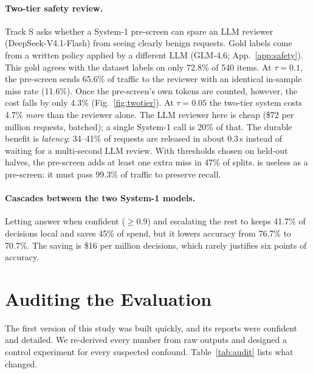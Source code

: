 \paragraph{Two-tier safety review.}
Track S asks whether a System-1 pre-screen can spare an LLM reviewer (DeepSeek-V4.1-Flash) from seeing clearly benign requests. Gold labels come from a written policy applied by a different LLM (GLM-4.6; App.~\ref{app:safety}). This gold agrees with the dataset labels on only 72.8\% of 540 items. At $\tau{=}0.1$, the \jev{} pre-screen sends 65.6\% of traffic to the reviewer with an identical in-sample miss rate (11.6\%). Once the pre-screen's own tokens are counted, however, the cost falls by only 4.3\% (Fig.~\ref{fig:twotier}). At $\tau{=}0.05$ the two-tier system costs 4.7\% \emph{more} than the reviewer alone. The LLM reviewer here is cheap (\$72 per million requests, batched); a single System-1 call is 20\% of that. The durable benefit is \emph{latency}: 34--41\% of requests are released in about 0.3\,s instead of waiting for a multi-second LLM review. With thresholds chosen on held-out halves, the pre-screen adds at least one extra miss in 47\% of splits. \laya{} is useless as a pre-screen: it must pass 99.3\% of traffic to preserve recall.

\paragraph{Cascades between the two System-1 models.}
Letting \laya{} answer when confident ($\geq$0.9) and escalating the rest to \jev{} keeps 41.7\% of decisions local and saves 45\% of \jev{} spend, but it lowers accuracy from 76.7\% to 70.7\%. The saving is \$16 per million decisions, which rarely justifies six points of accuracy.

\section{Auditing the Evaluation}\label{sec:audit}
The first version of this study was built quickly, and its reports were confident and detailed. We re-derived every number from raw outputs and designed a control experiment for every suspected confound. Table~\ref{tab:audit} lists what changed.

